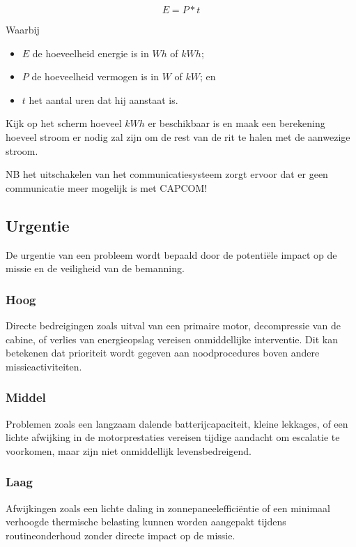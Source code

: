$$E = P * t$$

Waarbij
\begin{itemize}
    \item $E$ de hoeveelheid energie is in $Wh$ of $kWh$;
    \item $P$ de hoeveelheid vermogen is in $W$ of $kW$; en
    \item $t$ het aantal uren dat hij aanstaat is.
\end{itemize}

Kijk op het scherm hoeveel $kWh$ er beschikbaar is en maak een berekening hoeveel stroom er nodig zal zijn om de rest van de rit te halen met de aanwezige stroom.

NB het uitschakelen van het communicatiesysteem zorgt ervoor dat er geen communicatie meer mogelijk is met CAPCOM!


\subsection{Urgentie}
De urgentie van een probleem wordt bepaald door de potentiële impact op de missie en de veiligheid van de bemanning.

\subsubsection{Hoog}
Directe bedreigingen zoals uitval van een primaire motor, decompressie van de cabine, of verlies van energieopslag vereisen onmiddellijke interventie. Dit kan betekenen dat prioriteit wordt gegeven aan noodprocedures boven andere missieactiviteiten.

\subsubsection{Middel}
Problemen zoals een langzaam dalende batterijcapaciteit, kleine lekkages, of een lichte afwijking in de motorprestaties vereisen tijdige aandacht om escalatie te voorkomen, maar zijn niet onmiddellijk levensbedreigend.

\subsubsection{Laag}
Afwijkingen zoals een lichte daling in zonnepaneelefficiëntie of een minimaal verhoogde thermische belasting kunnen worden aangepakt tijdens routineonderhoud zonder directe impact op de missie.